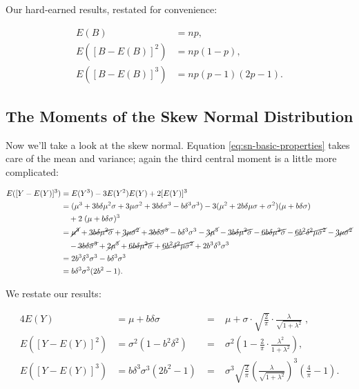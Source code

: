 \documentclass{article}
\begin{document}
Our hard-earned results, restated for convenience:

\begin{align}
  E(B) &= np, \nonumber \\
  E([B - E(B)]^2) &= np(1-p), \\
  E([B - E(B)]^3) &= np(p-1)(2p-1). \nonumber
\end{align}

\subsection{The Moments of the Skew Normal Distribution}

Now we'll take a look at the skew normal. Equation
\eqref{eq:sn-basic-properties} takes care of the mean and variance; again the
third central moment is a little more complicated:

\begin{align*}
  E([Y - E(Y)]^3) &= E(Y^3) - 3E(Y^2)E(Y) + 2[E(Y)]^3 \\
  &= (\mu^3 + 3 b \delta \mu^2 \sigma + 3 \mu \sigma^2 + 3 b \delta \sigma^3 - b \delta^3 \sigma^3) - 3 (\mu^2 + 2b \delta \mu \sigma + \sigma^2) (\mu + b \delta \sigma) \\
  & \quad + 2\;(\mu + b \delta \sigma)^3 \\
  &= \cancel{\mu^3} + \cancel{3 b \delta \mu^2 \sigma} + \cancel{3 \mu \sigma^2} + \cancel{3 b \delta \sigma^3} - b \delta^3 \sigma^3 - \cancel{3 \mu^3} - \cancel{3 b \delta \mu^2 \sigma} -
    \cancel{6 b \delta \mu^2 \sigma} - \cancel{6 b^2 \delta^2 \mu \sigma^2} - \cancel{3 \mu \sigma^2} \\
  & \quad - \cancel{3 b \delta \sigma^3} + \cancel{2 \mu^3} + \cancel{6 b \delta \mu^2 \sigma} + \cancel{6 b^2 \delta^2 \mu \sigma^2} + 2 b^3 \delta^3 \sigma^3 \\
  &= 2 b^3 \delta^3 \sigma^3 - b \delta^3 \sigma^3 \\
  &= b \delta^3 \sigma^3 (2b^2 - 1).
\end{align*}

We restate our results:

\begin{alignat}{4}
  E(Y) &= \mu + b \delta \sigma \;&=&\; \mu + \sigma \cdot \sqrt{\frac{2}{\pi}} \cdot \frac{\lambda}{\sqrt{1 + \lambda^2}} \;, \nonumber \\
  E([Y - E(Y)]^2) &= \sigma^2 (1 - b^2 \delta^2) \;&=&\; \sigma^2 \left( 1 - \frac{2}{\pi} \cdot \frac{\lambda^2}{1 + \lambda^2} \right), \\
  E([Y - E(Y)]^3) &= b \delta^3 \sigma^3 (2b^2 - 1) \;&=&\; \sigma^3 \sqrt{\frac{2}{\pi}} \left( \frac{\lambda}{\sqrt{1 + \lambda^2}} \right)^3 \left( \frac{4}{\pi} - 1 \right). \nonumber
\end{alignat}
\end{document}
